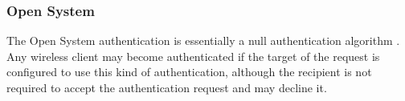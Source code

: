 \subsubsection{Open System}

The Open System authentication is essentially a null authentication algorithm \cite{ieee_80211_2020}. Any wireless client may become authenticated if the target of the request is configured to use this kind of authentication, although the recipient is not required to accept the authentication request and may decline it.
